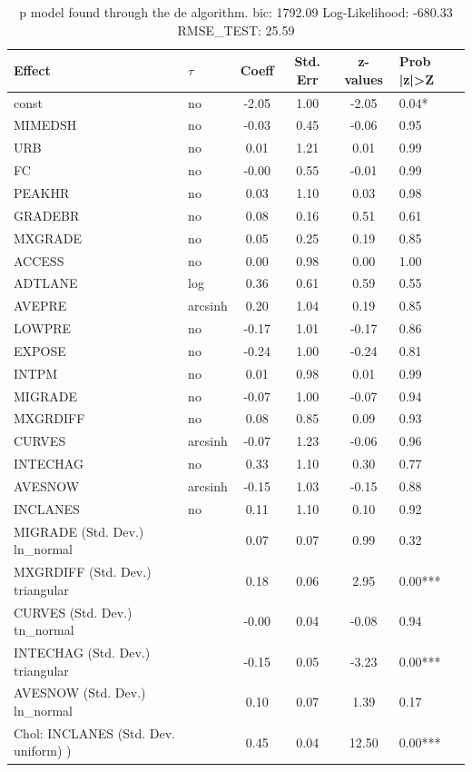 \begin{table}
	\caption{p model found through the de algorithm. bic: 1792.09 Log-Likelihood: -680.33 RMSE_TEST: 25.59}
	\begin{center}
		\begin{tabular}{|l|l|c|c|c|l|}
			\hline
			Effect & $\tau$ & Coeff & Std. Err & z-values & Prob |z|>Z \\
			\hline
			const & no & -2.05 & 1.00 & -2.05 & 0.04* \\
			\hline
			MIMEDSH & no & -0.03 & 0.45 & -0.06 & 0.95 \\
			\hline
			URB & no & 0.01 & 1.21 & 0.01 & 0.99 \\
			\hline
			FC & no & -0.00 & 0.55 & -0.01 & 0.99 \\
			\hline
			PEAKHR & no & 0.03 & 1.10 & 0.03 & 0.98 \\
			\hline
			GRADEBR & no & 0.08 & 0.16 & 0.51 & 0.61 \\
			\hline
			MXGRADE & no & 0.05 & 0.25 & 0.19 & 0.85 \\
			\hline
			ACCESS & no & 0.00 & 0.98 & 0.00 & 1.00 \\
			\hline
			ADTLANE & log & 0.36 & 0.61 & 0.59 & 0.55 \\
			\hline
			AVEPRE & arcsinh & 0.20 & 1.04 & 0.19 & 0.85 \\
			\hline
			LOWPRE & no & -0.17 & 1.01 & -0.17 & 0.86 \\
			\hline
			EXPOSE & no & -0.24 & 1.00 & -0.24 & 0.81 \\
			\hline
			INTPM & no & 0.01 & 0.98 & 0.01 & 0.99 \\
			\hline
			MIGRADE & no & -0.07 & 1.00 & -0.07 & 0.94 \\
			\hline
			MXGRDIFF & no & 0.08 & 0.85 & 0.09 & 0.93 \\
			\hline
			CURVES & arcsinh & -0.07 & 1.23 & -0.06 & 0.96 \\
			\hline
			INTECHAG & no & 0.33 & 1.10 & 0.30 & 0.77 \\
			\hline
			AVESNOW & arcsinh & -0.15 & 1.03 & -0.15 & 0.88 \\
			\hline
			INCLANES & no & 0.11 & 1.10 & 0.10 & 0.92 \\
			\hline
			MIGRADE (Std. Dev.) ln_normal &  & 0.07 & 0.07 & 0.99 & 0.32 \\
			\hline
			MXGRDIFF (Std. Dev.) triangular &  & 0.18 & 0.06 & 2.95 & 0.00*** \\
			\hline
			CURVES (Std. Dev.) tn_normal &  & -0.00 & 0.04 & -0.08 & 0.94 \\
			\hline
			INTECHAG (Std. Dev.) triangular &  & -0.15 & 0.05 & -3.23 & 0.00*** \\
			\hline
			AVESNOW (Std. Dev.) ln_normal &  & 0.10 & 0.07 & 1.39 & 0.17 \\
			\hline
			 Chol: INCLANES (Std. Dev. uniform) ) &  & 0.45 & 0.04 & 12.50 & 0.00*** \\
			\hline
		\end{tabular}
	\end{center}
\end{table}